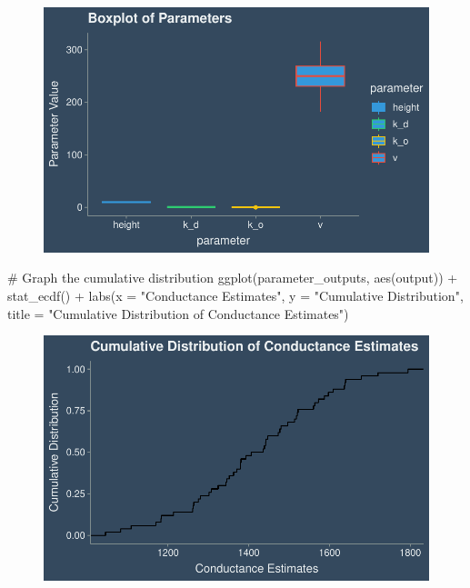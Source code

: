 \documentclass[
  letterpaper,
  DIV=11,
  numbers=noendperiod]{scrartcl}
\newenvironment{Shaded}{\begin{snugshade}}{\end{snugshade}}
\newcommand{\AttributeTok}[1]{\textcolor[rgb]{0.40,0.45,0.13}{#1}}
\newcommand{\CommentTok}[1]{\textcolor[rgb]{0.37,0.37,0.37}{#1}}
\newcommand{\FunctionTok}[1]{\textcolor[rgb]{0.28,0.35,0.67}{#1}}
\newcommand{\NormalTok}[1]{\textcolor[rgb]{0.00,0.23,0.31}{#1}}
\newcommand{\SpecialCharTok}[1]{\textcolor[rgb]{0.37,0.37,0.37}{#1}}
\newcommand{\StringTok}[1]{\textcolor[rgb]{0.13,0.47,0.30}{#1}}
\begin{document}
\begin{figure}[H]

{\centering \includegraphics{sensitivity-analysis_files/figure-pdf/unnamed-chunk-5-1.pdf}

}

\end{figure}

\begin{Shaded}
\begin{Highlighting}[]
\CommentTok{\# Graph the cumulative distribution}
\FunctionTok{ggplot}\NormalTok{(parameter\_outputs, }\FunctionTok{aes}\NormalTok{(output)) }\SpecialCharTok{+}
  \FunctionTok{stat\_ecdf}\NormalTok{() }\SpecialCharTok{+}
  \FunctionTok{labs}\NormalTok{(}\AttributeTok{x =} \StringTok{"Conductance Estimates"}\NormalTok{, }\AttributeTok{y =} \StringTok{"Cumulative Distribution"}\NormalTok{, }\AttributeTok{title =} \StringTok{"Cumulative Distribution of Conductance Estimates"}\NormalTok{) }
\end{Highlighting}
\end{Shaded}

\begin{figure}[H]

{\centering \includegraphics{sensitivity-analysis_files/figure-pdf/unnamed-chunk-6-1.pdf}

}

\end{figure}
\end{document}
